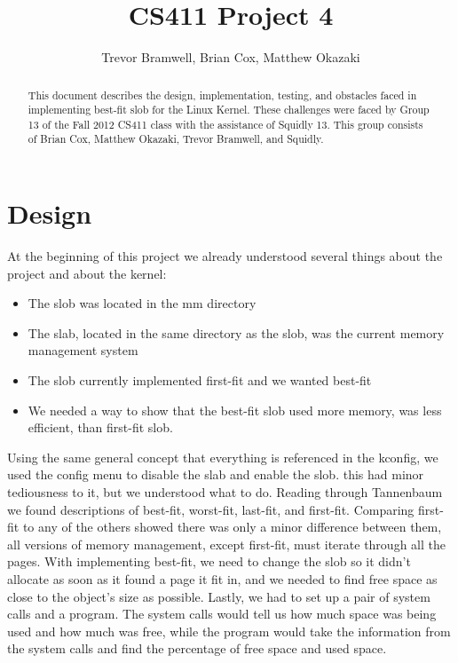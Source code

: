 \documentclass[letterpaper,10pt]{article}
\begin{document}
\title{CS411 Project 4}


\date{Trevor Bramwell, Brian Cox, Matthew Okazaki }
\maketitle
\begin{abstract}
This document describes the design, implementation, testing, and obstacles
faced in implementing best-fit slob for the Linux Kernel. These challenges
were faced by Group 13 of the Fall 2012 CS411 class with the assistance
of Squidly 13. This group consists of Brian Cox, Matthew Okazaki,
Trevor Bramwell, and Squidly. 
\end{abstract}

\section*{Design }

At the beginning of this project we already understood several things
about the project and about the kernel:
\begin{itemize}
\item The slob was located in the mm directory 
\item The slab, located in the same directory as the slob, was the current
memory management system 
\item The slob currently implemented first-fit and we wanted best-fit 
\item We needed a way to show that the best-fit slob used more memory, was
less efficient, than first-fit slob.
\end{itemize}
Using the same general concept that everything is referenced in the
kconfig, we used the config menu to disable the slab and enable the
slob. this had minor tediousness to it, but we understood what to
do. Reading through Tannenbaum we found descriptions of best-fit,
worst-fit, last-fit, and first-fit. Comparing first-fit to any of
the others showed there was only a minor difference between them,
all versions of memory management, except first-fit, must iterate
through all the pages. With implementing best-fit, we need to change
the slob so it didn\textquoteright{}t allocate as soon as it found
a page it fit in, and we needed to find free space as close to the
object\textquoteright{}s size as possible. Lastly, we had to set up
a pair of system calls and a program. The system calls would tell
us how much space was being used and how much was free, while the
program would take the information from the system calls and find
the percentage of free space and used space. 
\end{document}
